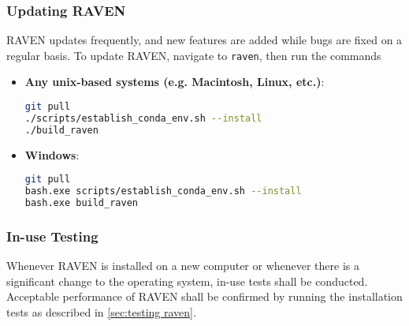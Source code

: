 \subsubsection{Updating RAVEN}
RAVEN updates frequently, and new features are added while bugs are fixed on a regular basis.  To update
RAVEN, navigate to \texttt{raven}, then run the commands
\begin{itemize}

  \item \textbf{Any unix-based systems (e.g. Macintosh, Linux, etc.)}:
\begin{lstlisting}[language=bash]
git pull
./scripts/establish_conda_env.sh --install
./build_raven
\end{lstlisting}
  \item \textbf{Windows}:
  \begin{lstlisting}[language=bash]
git pull
bash.exe scripts/establish_conda_env.sh --install
bash.exe build_raven
\end{lstlisting}
  
\end{itemize}

\subsubsection{In-use Testing}
Whenever RAVEN is installed on a new computer or whenever there is a significant change to the operating system, 
in-use tests shall be conducted.
Acceptable performance of RAVEN shall be confirmed by running the installation tests as described in  \ref{sec:testing raven}.
